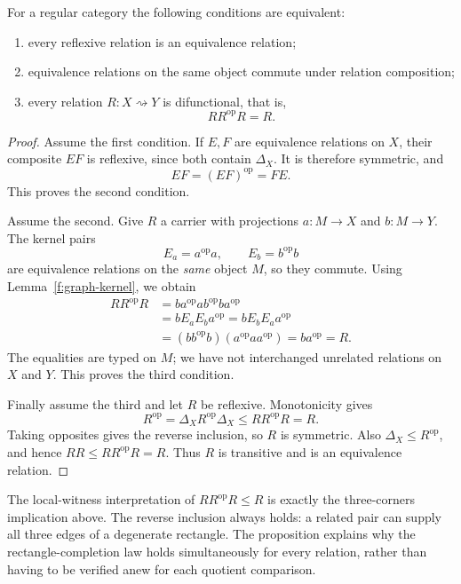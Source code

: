 \begin{proposition}\label{d:difunctional}
For a regular category the following conditions are equivalent:
\begin{enumerate}
\item every reflexive relation is an equivalence relation;
\item equivalence relations on the same object commute under
relation composition;
\item every relation $R:X\rightsquigarrow Y$ is difunctional, that is,
\[
RR^{\mathrm{op}}R=R.
\]
\end{enumerate}
\end{proposition}
\begin{proof}
Assume the first condition. If $E,F$ are equivalence relations on $X$,
their composite $EF$ is reflexive, since both contain $\Delta_X$.
It is therefore symmetric, and
\[
EF=(EF)^{\mathrm{op}}=FE.
\]
This proves the second condition.

Assume the second. Give $R$ a carrier with projections
$a:M\to X$ and $b:M\to Y$. The kernel pairs
\[
E_a=a^{\mathrm{op}}a,\qquad E_b=b^{\mathrm{op}}b
\]
are equivalence relations on the \emph{same} object $M$, so they
commute. Using Lemma~\ref{f:graph-kernel}, we obtain
\begin{align*}
RR^{\mathrm{op}}R
&=ba^{\mathrm{op}}ab^{\mathrm{op}}ba^{\mathrm{op}}\\
&=bE_aE_ba^{\mathrm{op}}
 =bE_bE_aa^{\mathrm{op}}\\
&=(bb^{\mathrm{op}}b)(a^{\mathrm{op}}aa^{\mathrm{op}})
 =ba^{\mathrm{op}}=R.
\end{align*}
The equalities are typed on $M$; we have not interchanged unrelated
relations on $X$ and $Y$. This proves the third condition.

Finally assume the third and let $R$ be reflexive. Monotonicity gives
\[
R^{\mathrm{op}}=\Delta_XR^{\mathrm{op}}\Delta_X
\leq RR^{\mathrm{op}}R=R.
\]
Taking opposites gives the reverse inclusion, so $R$ is symmetric.
Also $\Delta_X\leq R^{\mathrm{op}}$, and hence
$RR\leq RR^{\mathrm{op}}R=R$. Thus $R$ is transitive and is an
equivalence relation.
\end{proof}

The local-witness interpretation of $RR^{\mathrm{op}}R\leq R$ is
exactly the three-corners implication above. The reverse inclusion
always holds: a related pair can supply all three edges of a degenerate
rectangle. The proposition explains why the rectangle-completion law
holds simultaneously for every relation, rather than having to be
verified anew for each quotient comparison.

